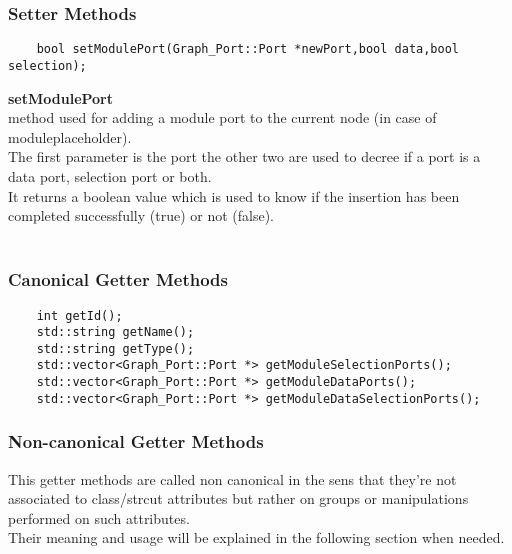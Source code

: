 \documentclass{article}
\begin{document}
\subsubsection{Setter Methods}

\begin{mdframed}[hidealllines=true, backgroundcolor=magenta!10]
	\begin{lstlisting}
	bool setModulePort(Graph_Port::Port *newPort,bool data,bool selection);
	\end{lstlisting}
\end{mdframed}

\textbf{setModulePort}\\
method used for adding a module port to the current node (in case of moduleplaceholder).\\
The first parameter is the port the other two are used to decree if a port is a data port, selection port or both.\\
It returns a boolean value which is used to know if the insertion has been completed successfully (true) or not (false).\\\\

\subsubsection{Canonical Getter Methods}

\begin{mdframed}[hidealllines=true, backgroundcolor=magenta!10]
	\begin{lstlisting}
	int getId();
	std::string getName();
	std::string getType();
	std::vector<Graph_Port::Port *> getModuleSelectionPorts();
	std::vector<Graph_Port::Port *> getModuleDataPorts();
	std::vector<Graph_Port::Port *> getModuleDataSelectionPorts();
	\end{lstlisting}
\end{mdframed}

\subsubsection{Non-canonical Getter Methods}

This getter methods are called non canonical in the sens that they're not associated to class/strcut attributes but rather on groups or manipulations performed on such attributes.\\
Their meaning and usage will be explained in the following section when needed.\\
\end{document}
